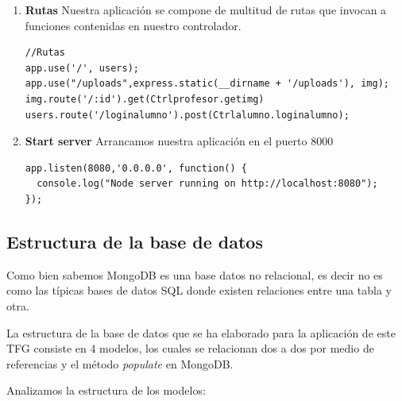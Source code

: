 \begin{enumerate}
    \item \textbf{Rutas} Nuestra aplicación se compone de multitud de rutas que invocan a funciones contenidas en nuestro controlador.
\begin{lstlisting}
//Rutas
app.use('/', users);
app.use("/uploads",express.static(__dirname + '/uploads'), img);
img.route('/:id').get(Ctrlprofesor.getimg)
users.route('/loginalumno').post(Ctrlalumno.loginalumno);
\end{lstlisting}
    \item \textbf{Start server} Arrancamos nuestra aplicación en el puerto 8000
\begin{lstlisting}
app.listen(8080,'0.0.0.0', function() {
  console.log("Node server running on http://localhost:8080");
});
\end{lstlisting}
\end{enumerate}

\subsection{Estructura de la base de datos}
Como bien sabemos MongoDB es una base datos no relacional, es decir no es como las típicas bases de datos SQL donde existen relaciones entre una tabla y otra.

La estructura de la base de datos que se ha elaborado para la aplicación de este TFG consiste en 4 modelos, los cuales se relacionan dos a dos por medio de referencias y el método \textit{populate} en MongoDB.

Analizamos la estructura de los modelos:

